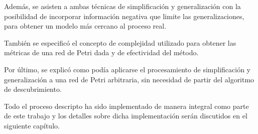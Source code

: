 Además, se asisten a ambas técnicas de simplificación y generalización con la posibilidad de incorporar
información negativa que limite las generalizaciones, para obtener un modelo más cercano al proceso real.

También se especificó el concepto de complejidad utilizado para obtener las métricas de una red de
Petri dada y de efectividad del método.

Por último, se explicó como podía aplicarse el procesamiento de simplificación y generalización a una red de 
Petri arbitraria, sin necesidad de partir del algoritmo de descubrimiento.

Todo el proceso descripto ha sido implementado de manera integral como parte de este trabajo
y los detalles sobre dicha implementación serán discutidos en el siguiente capítulo.
